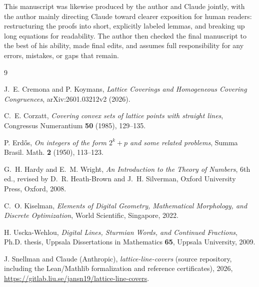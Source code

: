 \documentclass[a4paper,11pt,oneside,reqno]{amsart}
\theoremstyle{definition}
\theoremstyle{remark}
\theoremstyle{plain}
\begin{document}
This manuscript was likewise produced by the author and Claude jointly, with the author mainly
directing Claude toward clearer exposition for human readers: restructuring the proofs into short,
explicitly labeled lemmas, and breaking up long equations for readability. The author then checked
the final manuscript to the best of his ability, made final edits, and assumes full responsibility
for any errors, mistakes, or gaps that remain.

\begin{thebibliography}{9}

J.~E. Cremona and P. Koymans, \emph{Lattice Coverings and Homogeneous Covering Congruences},
arXiv:2601.03212v2 (2026).

C.~E. Corzatt, \emph{Covering convex sets of lattice points with straight lines}, Congressus
Numerantium \textbf{50} (1985), 129--135.

P. Erd\H{o}s, \emph{On integers of the form \(2^k+p\) and some related problems}, Summa Brasil.
Math. \textbf{2} (1950), 113--123.

G.~H. Hardy and E.~M. Wright, \emph{An Introduction to the Theory of Numbers}, 6th ed., revised
by D.~R. Heath-Brown and J.~H. Silverman, Oxford University Press, Oxford, 2008.

C.~O. Kiselman, \emph{Elements of Digital Geometry, Mathematical Morphology, and Discrete
Optimization}, World Scientific, Singapore, 2022.

H. Uscka-Wehlou, \emph{Digital Lines, Sturmian Words, and Continued Fractions}, Ph.D. thesis,
Uppsala Dissertations in Mathematics \textbf{65}, Uppsala University, 2009.

J. Snellman and Claude (Anthropic), \emph{lattice-line-covers} (source repository, including the
Lean/Mathlib formalization and reference certificates), 2026,
\url{https://gitlab.liu.se/jansn19/lattice-line-covers}.

\end{thebibliography}
\end{document}
